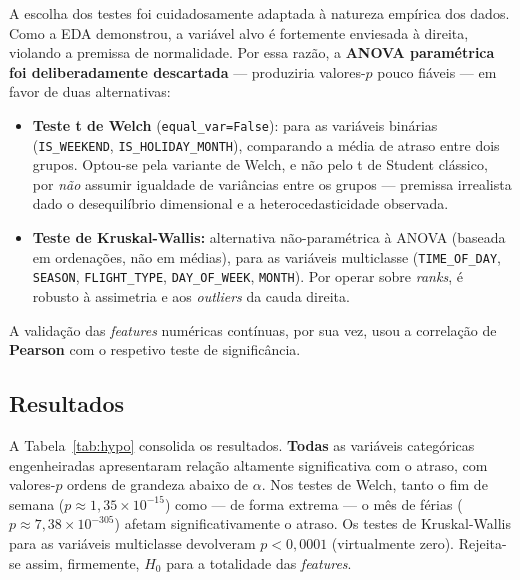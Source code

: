 \documentclass[conference]{IEEEtran}
\begin{document}
A escolha dos testes foi cuidadosamente adaptada à natureza empírica dos dados.
Como a EDA demonstrou, a variável alvo é fortemente enviesada à direita,
violando a premissa de normalidade. Por essa razão, a \textbf{ANOVA paramétrica
foi deliberadamente descartada} — produziria valores-$p$ pouco fiáveis — em
favor de duas alternativas:
\begin{itemize}
\item \textbf{Teste t de Welch} (\texttt{equal\_var=False}): para as variáveis
      binárias (\texttt{IS\_WEEKEND}, \texttt{IS\_HOLIDAY\_MONTH}), comparando a
      média de atraso entre dois grupos. Optou-se pela variante de Welch, e não
      pelo t de Student clássico, por \emph{não} assumir igualdade de
      variâncias entre os grupos — premissa irrealista dado o desequilíbrio
      dimensional e a heterocedasticidade observada.
\item \textbf{Teste de Kruskal-Wallis:} alternativa não-paramétrica à ANOVA
      (baseada em ordenações, não em médias), para as variáveis multiclasse
      (\texttt{TIME\_OF\_DAY}, \texttt{SEASON}, \texttt{FLIGHT\_TYPE},
      \texttt{DAY\_OF\_WEEK}, \texttt{MONTH}). Por operar sobre \textit{ranks},
      é robusto à assimetria e aos \textit{outliers} da cauda direita.
\end{itemize}
A validação das \textit{features} numéricas contínuas, por sua vez, usou a
correlação de \textbf{Pearson} com o respetivo teste de significância.

\subsection{Resultados}
A Tabela~\ref{tab:hypo} consolida os resultados. \textbf{Todas} as variáveis
categóricas engenheiradas apresentaram relação altamente significativa com o
atraso, com valores-$p$ ordens de grandeza abaixo de $\alpha$. Nos testes de
Welch, tanto o fim de semana ($p \approx 1{,}35\times10^{-15}$) como — de forma
extrema — o mês de férias ($p \approx 7{,}38\times10^{-305}$) afetam
significativamente o atraso. Os testes de Kruskal-Wallis para as variáveis
multiclasse devolveram $p < 0{,}0001$ (virtualmente zero). Rejeita-se assim,
firmemente, $H_0$ para a totalidade das \textit{features}.
\end{document}
